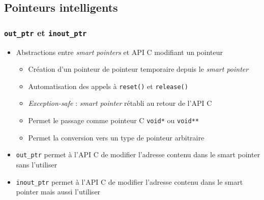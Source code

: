 \documentclass[C++.tex]{subfiles}
\begin{document}
\subsection*{Pointeurs intelligents}
\begin{frame}[fragile]
	\frametitle{\lstinline|out_ptr| et \lstinline|inout_ptr|}
	\begin{itemize}
		\item Abstractions entre \textit{smart pointers} et API C modifiant un pointeur


		\begin{itemize}
			\item Création d'un pointeur de pointeur temporaire depuis le \textit{smart pointer}
			\item Automatisation des appels à \lstinline|reset()| et \lstinline|release()|
			\item \textit{Exception-safe} : \textit{smart pointer} rétabli au retour de l'API C	


			\item Permet le passage comme pointeur C \lstinline|void*| ou \lstinline|void**|
			\item Permet la conversion vers un type de pointeur arbitraire
		\end{itemize}
		\item \lstinline|out_ptr| permet à l'API C de modifier l'adresse contenu dans le smart pointer sans l'utiliser
		\item \lstinline|inout_ptr| permet à l'API C de modifier l'adresse contenu dans le smart pointer mais aussi l'utiliser
	\end{itemize}
\end{frame}
\end{document}
